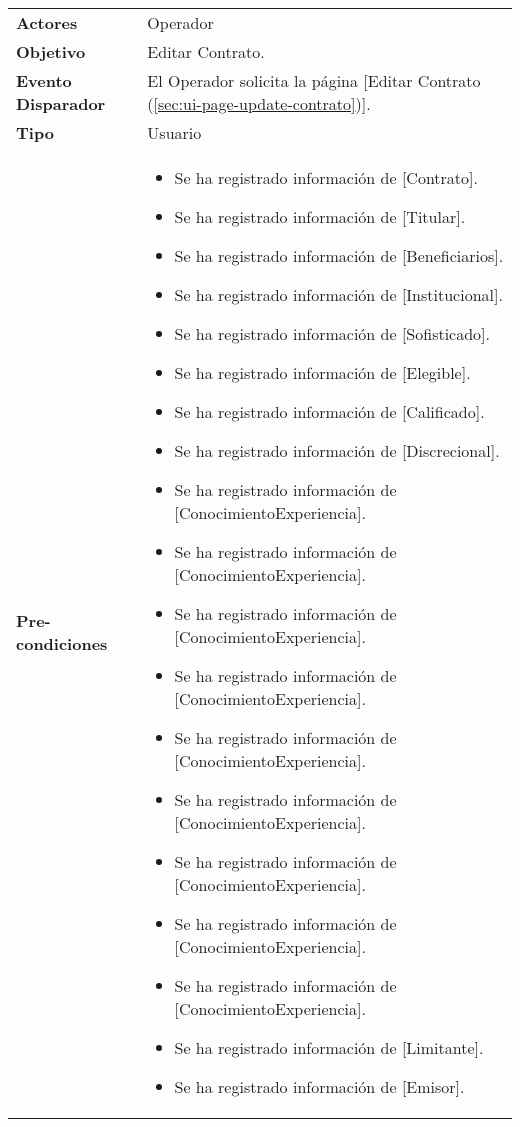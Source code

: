 	\begin{tabular}{ p{3.5cm} p{11.5cm} }
		\textbf{Actores} & Operador\\
		\textbf{Objetivo} & Editar Contrato.\\
		\textbf{Evento Disparador} & El Operador solicita la p\'agina [Editar Contrato (\ref{sec:ui-page-update-contrato})].\\
		\textbf{Tipo} & Usuario\\
		\textbf{Pre-condiciones} &
			\begin{minipage}[t]{0.6\textwidth}
			\begin{itemize}[noitemsep,nolistsep]
			\setlength{\itemindent}{-.5cm}
				\item Se ha registrado informaci\'on de [Contrato].
				\item Se ha registrado informaci\'on de [Titular].
				\item Se ha registrado informaci\'on de [Beneficiarios].
				\item Se ha registrado informaci\'on de [Institucional].
				\item Se ha registrado informaci\'on de [Sofisticado].
				\item Se ha registrado informaci\'on de [Elegible].
				\item Se ha registrado informaci\'on de [Calificado].
				\item Se ha registrado informaci\'on de [Discrecional].
				\item Se ha registrado informaci\'on de [ConocimientoExperiencia].
				\item Se ha registrado informaci\'on de [ConocimientoExperiencia].
				\item Se ha registrado informaci\'on de [ConocimientoExperiencia].
				\item Se ha registrado informaci\'on de [ConocimientoExperiencia].
				\item Se ha registrado informaci\'on de [ConocimientoExperiencia].
				\item Se ha registrado informaci\'on de [ConocimientoExperiencia].
				\item Se ha registrado informaci\'on de [ConocimientoExperiencia].
				\item Se ha registrado informaci\'on de [ConocimientoExperiencia].
				\item Se ha registrado informaci\'on de [ConocimientoExperiencia].
				\item Se ha registrado informaci\'on de [Limitante].
				\item Se ha registrado informaci\'on de [Emisor].

\end{itemize}
\end{minipage}
\end{tabular}

